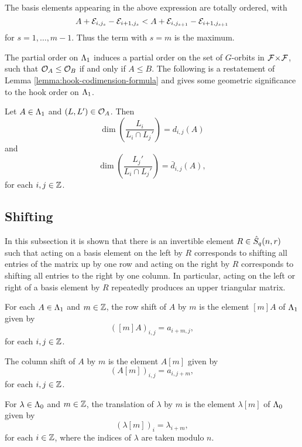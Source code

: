 \documentclass[a4paper, 11pt, twoside]{report}
\begin{document}
The basis elements appearing in the above expression are totally ordered, with
\begin{equation*}
A+\mathcal{E}_{i,j_s}-\mathcal{E}_{i+1,j_s} < A+\mathcal{E}_{i,j_{s+1}}-\mathcal{E}_{i+1,j_{s+1}}
\end{equation*}
for $s=1,\ldots,m-1$. Thus the term with $s=m$ is the maximum.

The partial order on $\Lambda_1{}$ induces a partial order on the set of $G$-orbits in ${\mathcal{F}\!\times\!\mathcal{F}}$, such that $\mathcal{O}_{A}\le \mathcal{O}_{B}$ if and only if $A\le B$. The following is a restatement of Lemma \ref{lemma:hook-codimension-formula} and gives some geometric significance to the hook order on $\Lambda_1{}$.

\begin{lemma}
Let $A\in\Lambda_1{}$ and $(L,L')\in\mathcal{O}_{A}$. Then
\begin{equation*}
\dim\left(\frac{L_i}{L_i\cap L_j'}\right) = d_{i,j}{(A)}
\end{equation*}
and
\begin{equation*}
\dim\left(\frac{L_j'}{L_i\cap L_j'}\right) = \bar{d}_{i,j}{(A)},
\end{equation*}
for each $i,j\in\mathbb{Z}$.
\end{lemma}


\subsection{Shifting}

In this subsection it is shown that there is an invertible element $R\in\hat{S}_q(n,r)$ such that acting on a basis element on the left by $R$ corresponds to shifting all entries of the matrix up by one row and acting on the right by $R$ corresponds to shifting all entries to the right by one column. In particular, acting on the left or right of a basis element by $R$ repeatedly produces an upper triangular matrix.

For each $A\in\Lambda_1{}$ and $m\in\mathbb{Z}$, the row shift of $A$ by $m$ is the element $[m]A$ of $\Lambda_1{}$ given by
\begin{equation*}
([m]A)_{i,j} = a_{i+m,j},
\end{equation*}
for each $i,j\in\mathbb{Z}$.

The column shift of $A$ by $m$ is the element $A[m]$ given by
\begin{equation*}
(A[m])_{i,j} = a_{i,j+m},
\end{equation*}
for each $i,j\in\mathbb{Z}$.

For $\lambda\in\Lambda_0{}$ and $m\in\mathbb{Z}$, the translation of $\lambda$ by $m$ is the element $\lambda[m]$ of $\Lambda_0{}$ given by
\begin{equation*}
(\lambda[m])_i = \lambda_{i+m},
\end{equation*}
for each $i\in\mathbb{Z}$, where the indices of $\lambda$ are taken modulo $n$.
\end{document}
